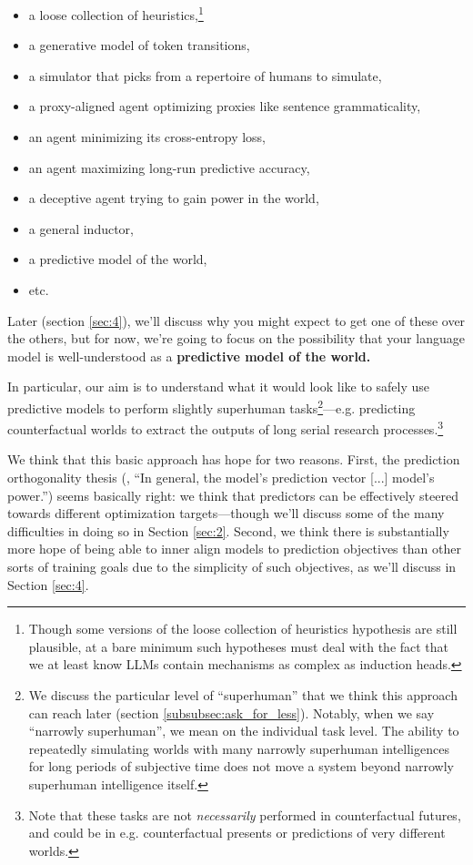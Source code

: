 \documentclass[
  twocolumn,
  natbib,
]{miri-tech-article}
\begin{document}
\begin{itemize}
\item a loose collection of heuristics,\footnote{Though some versions of the loose collection of heuristics hypothesis are still plausible, at a bare minimum such hypotheses must deal with the fact that we at least know LLMs contain mechanisms as complex as induction heads\cite{induction-heads}.}
\item a generative model of token transitions,
\item a simulator that picks from a repertoire of humans to simulate,
\item a proxy-aligned agent optimizing proxies like sentence grammaticality,
\item an agent minimizing its cross-entropy loss,
\item an agent maximizing long-run predictive accuracy,
\item a deceptive agent trying to gain power in the world,
\item a general inductor,
\item a predictive model of the world,
\item etc.
\end{itemize}

Later (section \ref{sec:4}), we'll discuss why you might expect to get one of these over the others, but for now, we're going to focus on the possibility that your language model is well-understood as a \textbf{predictive model of the world.}

In particular, our aim is to understand what it would look like to safely use predictive models to perform slightly superhuman tasks\footnote{We discuss the particular level of ``superhuman'' that we think this approach can reach later (section \ref{subsubsec:ask_for_less}). Notably, when we say ``narrowly superhuman'', we mean on the individual task level. The ability to repeatedly simulating worlds with many narrowly superhuman intelligences for long periods of subjective time does not move a system beyond narrowly superhuman intelligence itself.}---e.g. predicting counterfactual worlds to extract the outputs of long serial research processes.\footnote{Note that these tasks are not \textit{necessarily} performed in counterfactual futures, and could be in e.g. counterfactual presents or predictions of very different worlds.}



We think that this basic approach has hope for two reasons. First, the prediction orthogonality thesis (\cite{simulators}, ``In general, the model’s prediction vector [...] model’s power.'') seems basically right: we think that predictors can be effectively steered towards different optimization targets---though we'll discuss some of the many difficulties in doing so in Section \ref{sec:2}. Second, we think there is substantially more hope of being able to inner align\cite{risks} models to prediction objectives than other sorts of training goals\cite{how_become_confident} due to the simplicity of such objectives, as we'll discuss in Section \ref{sec:4}.
\end{document}
